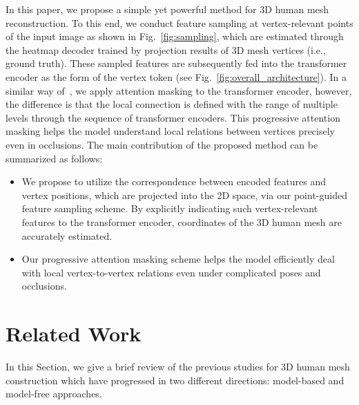 \documentclass[10pt,twocolumn,letterpaper]{article}
\begin{document}
In this paper, we propose a simple yet powerful method for 3D human mesh reconstruction. To this end, we conduct feature sampling at vertex-relevant points of the input image as shown in Fig.~\ref{fig:sampling}, which are estimated through the heatmap decoder trained by projection results of 3D mesh vertices (i.e., ground truth). These sampled features are subsequently fed into the transformer encoder as the form of the vertex token (see Fig.~\ref{fig:overall_architecture}). In a similar way of~\cite{Cho22}, we apply attention masking to the transformer encoder, however, the difference is that the local connection is defined with the range of multiple levels through the sequence of transformer encoders. This progressive attention masking helps the model understand local relations between vertices precisely even in occlusions. The main contribution of the proposed method can be summarized as follows:
\begin{itemize}
\item We propose to utilize the correspondence between encoded features and vertex positions, which are projected into the 2D space, via our point-guided feature sampling scheme. By explicitly indicating such vertex-relevant features to the transformer encoder, coordinates of the 3D human mesh are accurately estimated. 

\item Our progressive attention masking scheme helps the model efficiently deal with local vertex-to-vertex relations even under complicated poses and occlusions.
\end{itemize}


\section{Related Work}

In this Section, we give a brief review of the previous studies for 3D human mesh construction which have progressed in two different directions: model-based and model-free approaches.
\end{document}
